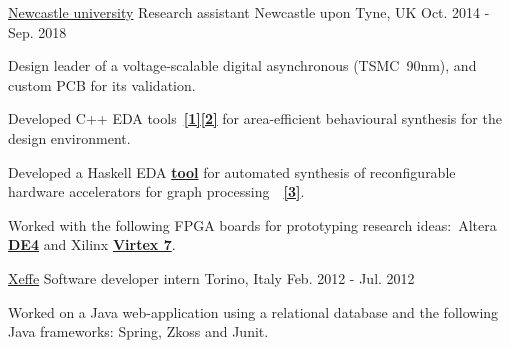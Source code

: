 
\begin{cventries}

\cventry
{\href{https://www.ncl.ac.uk/}{\color{myblue}Newcastle university}}
{Research assistant} %
{Newcastle upon Tyne, UK} %
{Oct. 2014 - Sep. 2018} %
{ 
\begin{cvitems}
\item {Design leader of a voltage-scalable digital asynchronous 
\href{https://ieeexplore.ieee.org/document/8342264/}{}
(TSMC~90nm), and custom PCB for its validation.}
\item {Developed C++ EDA
tools~{\color{myblue}\href{https://github.com/tuura/shutters}{\textbf{[1]}}}{\color{myblue}\href{https://github.com/tuura/scenco}{\textbf{[2]}}}
for area-efficient behavioural synthesis for the
\href{https://workcraft.org/}{}
design environment.}
\item {Developed a Haskell EDA 
{\color{myblue}\href{https://github.com/tuura/fantasi/tree/master/doc}{\textbf{tool}}}
for automated synthesis of reconfigurable hardware accelerators for graph
processing~~{\color{myblue}\href{https://poets-project.org/publications}{\textbf{[3]}}}.}
\item {Worked with the following FPGA boards for prototyping research 
ideas:~Altera 	
{\color{myblue}\href{https://www.altera.com/solutions/partners/partner-profile/terasic-inc-/board/de4-stratix-iv-development-board.html\#overview}{\textbf{DE4}}}
and Xilinx 	
{\color{myblue}\href{https://www.xilinx.com/products/boards-and-kits/ek-v7-vc707-g.html}{\textbf{Virtex
 7}}}.}
\end{cvitems}
}


\cventry
{\color{myblue}\href{http://www.xeffe.it/}{Xeffe}}
{Software developer intern}
{Torino, Italy}
{Feb. 2012 - Jul. 2012}
{
\begin{cvitems}
Worked on a Java web-application using a relational database and 
the following Java frameworks: Spring, Zkoss and Junit.
\end{cvitems}
}


\end{cventries}
\vspace{-1mm}